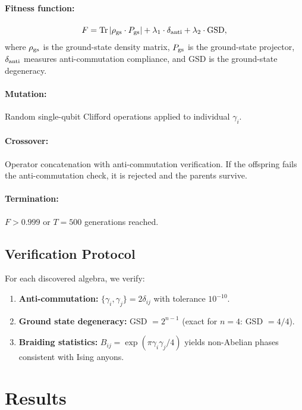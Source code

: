 \documentclass[12pt,reprint,amsfont,amssymb]{revtex4-2}
\begin{document}
\paragraph{Fitness function:}
\begin{equation}
F = \mathrm{Tr}\left|\rho_{\rm gs} \cdot P_{\rm gs}\right| + \lambda_1 \cdot \delta_{\rm anti} + \lambda_2 \cdot \mathrm{GSD},
\end{equation}
where $\rho_{\rm gs}$ is the ground-state density matrix, $P_{\rm gs}$ is the ground-state projector, $\delta_{\rm anti}$ measures anti-commutation compliance, and GSD is the ground-state degeneracy.

\paragraph{Mutation:} Random single-qubit Clifford operations applied to individual $\gamma_i$.

\paragraph{Crossover:} Operator concatenation with anti-commutation verification. If the offspring fails the anti-commutation check, it is rejected and the parents survive.

\paragraph{Termination:} $F > 0.999$ or $T = 500$ generations reached.

\subsection{Verification Protocol}

For each discovered algebra, we verify:
\begin{enumerate}
\item \textbf{Anti-commutation:} $\{\gamma_i, \gamma_j\} = 2\delta_{ij}$ with tolerance $10^{-10}$.
\item \textbf{Ground state degeneracy:} GSD $= 2^{n-1}$ (exact for $n=4$: GSD $= 4/4$).
\item \textbf{Braiding statistics:} $B_{ij} = \exp(\pi \gamma_i \gamma_j / 4)$ yields non-Abelian phases consistent with Ising anyons.
\end{enumerate}

\section{Results}
\label{sec:results}
\end{document}
